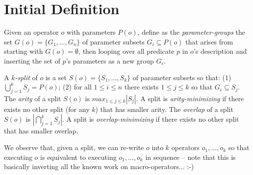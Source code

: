 

\section{Initial Definition}
\label{initial-definition}





Given an operator $o$ with parameters $P(o)$, define as the
\emph{parameter-groups} the set $G(o) = \{G_1, \dots, G_n\}$ of
parameter subsets $G_i \subseteq P(o)$ that arises from starting with
$G(o) = \emptyset$, then looping over all predicate $p$ in $o$'s
description and inserting the set of $p$'s parameters as a new group
$G_i$.


A \emph{$k$-split} of $o$ is a set $S(o) = \{S_1, \dots, S_k\}$ of
parameter subsets so that: (1) $\bigcup_{j=1}^k S_j = P(o)$; (2) for
all $1 \leq i \leq n$ there exists $1 \leq j \leq k$ so that $G_i
\subseteq S_j$. The \emph{arity} of a split $S(o)$ is $max_{1\leq j
  \leq k} |S_j|$. A split is \emph{arity-minimizing} if there exists
no other split (for any $k$) that has smaller arity. The
\emph{overlap} of a split $S(o)$ is $|\bigcap_{j=1}^k S_j|$. A split
is \emph{overlap-minimizing} if there exists no other split that has
smaller overlap.


We observe that, given a split, we can re-write $o$ into $k$ operators
$o_1, \dots, o_k$ so that executing $o$ is equivalent to executing
$o_1, \dots, o_k$ in sequence -- note that this is basically inverting
all the known work on macro-operators... :-)


